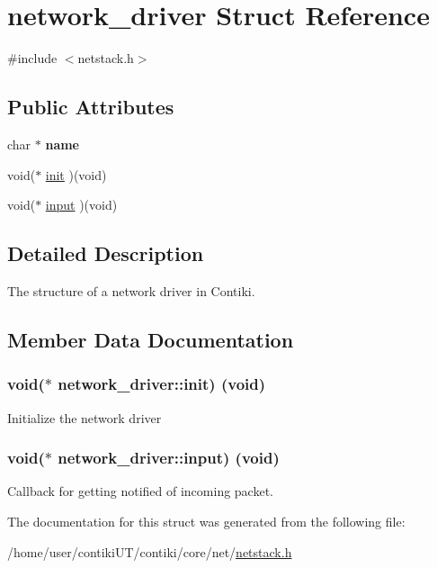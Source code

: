 \hypertarget{structnetwork__driver}{}\section{network\+\_\+driver Struct Reference}
\label{structnetwork__driver}


{\ttfamily \#include $<$netstack.\+h$>$}

\subsection*{Public Attributes}
\begin{DoxyCompactItemize}
\item 
\hypertarget{structnetwork__driver_a8395c2dfad73dc69bfa50331977a9b0f}{}char $\ast$ {\bfseries name}\label{structnetwork__driver_a8395c2dfad73dc69bfa50331977a9b0f}

\item 
void($\ast$ \hyperlink{structnetwork__driver_a07b6172431ed1ba10d9ac786760d352b}{init} )(void)
\item 
void($\ast$ \hyperlink{structnetwork__driver_a87d5f8ac5c426ff039e20a649d1f83ff}{input} )(void)
\end{DoxyCompactItemize}


\subsection{Detailed Description}
The structure of a network driver in Contiki. 

\subsection{Member Data Documentation}
\hypertarget{structnetwork__driver_a07b6172431ed1ba10d9ac786760d352b}{}
\subsubsection[{init}]{\setlength{\rightskip}{0pt plus 5cm}void($\ast$  network\+\_\+driver\+::init) (void)}\label{structnetwork__driver_a07b6172431ed1ba10d9ac786760d352b}
Initialize the network driver \hypertarget{structnetwork__driver_a87d5f8ac5c426ff039e20a649d1f83ff}{}
\subsubsection[{input}]{\setlength{\rightskip}{0pt plus 5cm}void($\ast$  network\+\_\+driver\+::input) (void)}\label{structnetwork__driver_a87d5f8ac5c426ff039e20a649d1f83ff}
Callback for getting notified of incoming packet. 

The documentation for this struct was generated from the following file\+:\begin{DoxyCompactItemize}
\item 
/home/user/contiki\+U\+T/contiki/core/net/\hyperlink{netstack_8h}{netstack.\+h}\end{DoxyCompactItemize}
